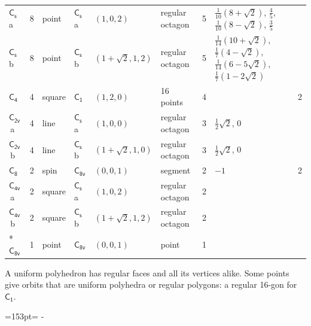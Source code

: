 \documentclass[10pt,a4paper]{article}
\newcommand{\needspace}[1]{\par\penalty-100\begingroup\dimen0=#1\relax\dimen2=\pagegoal
  \advance\dimen2-\pagetotal\ifdim\dimen0>\dimen2\relax\ifdim\dimen2>0pt\vfil\break\fi\fi
  \endgroup}
\numberwithin{equation}{section}
\newcommand{\grp}[1]{\mathsf{#1}}
\newcommand{\clsletter}[1]{\,{\scriptsize\color{black!55}#1}}
\newlength{\fillwidth}\newlength{\cellwidth}\newlength{\colwidth}
\begin{document}
{{\begin{longtable}{@{}lrllllr>{\RaggedRight\arraybackslash}p{\fillwidth}r@{}}
\href{C1v.pdf}{$\grp{C_{s}}$}\clsletter{a} & 8 & point & \href{C1v.pdf}{$\grp{C_{s}}$}\clsletter{a} & $(1, 0, 2)$ & regular octagon & 5 & ${\tfrac{1}{10}(8 + \sqrt{2})}$, ${\tfrac{4}{5}}$, ${\tfrac{1}{10}(8 - \sqrt{2})}$, ${\tfrac{3}{5}}$ & \\
\href{C1v.pdf}{$\grp{C_{s}}$}\clsletter{b} & 8 & point & \href{C1v.pdf}{$\grp{C_{s}}$}\clsletter{b} & $(1 + \sqrt{2}, 1, 2)$ & regular octagon & 5 & ${\tfrac{1}{14}(10 + \sqrt{2})}$, ${\tfrac{1}{7}(4 - \sqrt{2})}$, ${\tfrac{1}{14}(6 - 5\sqrt{2})}$, ${\tfrac{1}{7}(1 - 2\sqrt{2})}$ & \\
\href{C4.pdf}{$\grp{C_{4}}$} & 4 & square & \href{C1.pdf}{$\grp{C_{1}}$} & $(1, 2, 0)$ & 16 points & 4 &  & 2\\
\href{C2v.pdf}{$\grp{C_{2v}}$}\clsletter{a} & 4 & line & \href{C1v.pdf}{$\grp{C_{s}}$}\clsletter{a} & $(1, 0, 0)$ & regular octagon & 3 & ${\tfrac{1}{2}\sqrt{2}}$, ${0}$ & \\
\href{C2v.pdf}{$\grp{C_{2v}}$}\clsletter{b} & 4 & line & \href{C1v.pdf}{$\grp{C_{s}}$}\clsletter{b} & $(1 + \sqrt{2}, 1, 0)$ & regular octagon & 3 & ${\tfrac{1}{2}\sqrt{2}}$, ${0}$ & \\
\href{C8.pdf}{$\grp{C_{8}}$} & 2 & spin & \href{C8v.pdf}{$\grp{C_{8v}}$} & $(0, 0, 1)$ & segment & 2 & ${-1}$ & 2\\
\href{C4v.pdf}{$\grp{C_{4v}}$}\clsletter{a} & 2 & square & \href{C1v.pdf}{$\grp{C_{s}}$}\clsletter{a} & $(1, 0, 2)$ & regular octagon & 2 &  & \\
\href{C4v.pdf}{$\grp{C_{4v}}$}\clsletter{b} & 2 & square & \href{C1v.pdf}{$\grp{C_{s}}$}\clsletter{b} & $(1 + \sqrt{2}, 1, 2)$ & regular octagon & 2 &  & \\*
\href{C8v.pdf}{$\grp{C_{8v}}$} & 1 & point & \href{C8v.pdf}{$\grp{C_{8v}}$} & $(0, 0, 1)$ & point & 1 &  & \\
\bottomrule\end{longtable}}}
A uniform polyhedron has regular faces and all its vertices alike. Some points give orbits that are uniform polyhedra or regular polygons: a regular 16-gon for \href{C1.pdf}{$\grp{C_{1}}$}.
\needspace{153pt}
\end{document}
